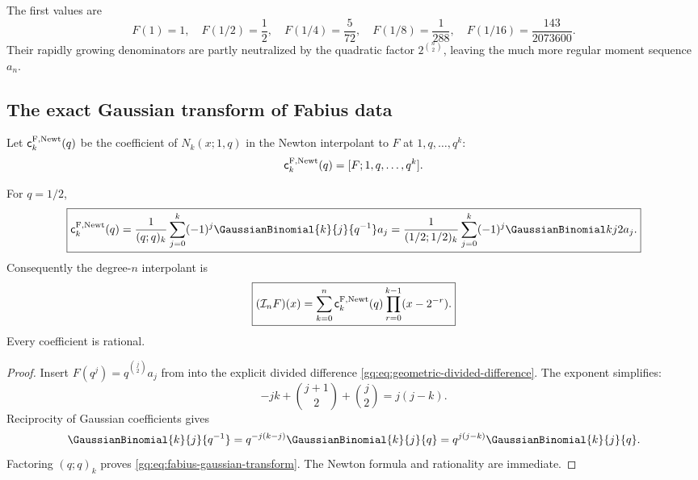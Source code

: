 The first values are
\begin{equation}
 F(1)=1,
 \quad F(1/2)=\frac12,
 \quad F(1/4)=\frac5{72},
 \quad F(1/8)=\frac1{288},
 \quad F(1/16)=\frac{143}{2073600}.
 \label{gq:eq:first-fabius-values}
\end{equation}
Their rapidly growing denominators are partly neutralized by the quadratic
factor $2^{\binom n2}$, leaving the much more regular moment sequence $a_n$.

\subsection{The exact Gaussian transform of Fabius data}
\label{gq:sec:fabius-newton-transform}

Let $\mathsf{c}^{\mathrm{F,Newt}}_{k}\!\left(q\right)$ be the coefficient of
$N_k(x;1,q)$ in the Newton interpolant to $F$ at $1,q,\ldots,q^k$:
\begin{equation}
 \mathsf{c}^{\mathrm{F,Newt}}_{k}\!\left(q\right)=[F;1,q,\ldots,q^k].
 \label{gq:eq:fabius-nu-definition}
\end{equation}

\begin{theorem}
\label{gq:thm:fabius-gaussian-transform}
For $q=1/2$,
\begin{equation}
 \boxed{
 \FabiusGeometricNewtonCoefficient{k}{q}=\frac1{(q;q)_k}
 \sum_{j=0}^{k}(-1)^j
 \GaussianBinomial{k}{j}{q^{-1}}a_j
 =\frac1{(1/2;1/2)_k}
 \sum_{j=0}^{k}(-1)^j\twobinom{k}{j}a_j.}
 \label{gq:eq:fabius-gaussian-transform}
\end{equation}
Consequently the degree-$n$ interpolant is
\begin{equation}
 \boxed{
 (\mathcal I_nF)(x)=\sum_{k=0}^{n}\mathsf{c}^{\mathrm{F,Newt}}_{k}\!\left(q\right)
 \prod_{r=0}^{k-1}(x-2^{-r}).}
 \label{gq:eq:fabius-newton-expansion}
\end{equation}
Every coefficient is rational.
\end{theorem}

\begin{proof}
Insert $F(q^j)=q^{\binom j2}a_j$ from
 into the explicit divided difference
\eqref{gq:eq:geometric-divided-difference}.  The exponent simplifies:
\[
 -jk+\binom{j+1}{2}+\binom j2=j(j-k).
\]
Reciprocity of Gaussian coefficients gives
\[
 \GaussianBinomial{k}{j}{q^{-1}}
 =q^{-j(k-j)}\GaussianBinomial{k}{j}{q}=q^{j(j-k)}\GaussianBinomial{k}{j}{q}.
\]
Factoring $(q;q)_k$ proves \eqref{gq:eq:fabius-gaussian-transform}.  The Newton
formula and rationality are immediate.
\end{proof}

